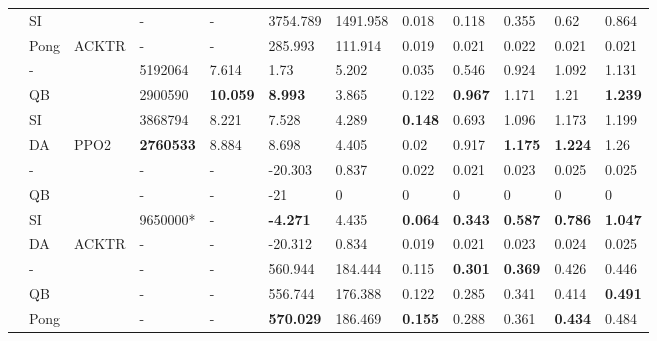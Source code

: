 \begin{table}[]
\begin{tabular}{p{1.3cm}p{1cm}p{0.9cm}p{1cm}p{1.3cm}p{1.2cm}p{1.2cm}p{0.7cm}p{0.7cm}p{0.7cm}p{0.7cm}p{0.7cm}}
		\rowcolor[HTML]{C0C0C0} 
		\cellcolor[HTML]{EFEFEF} & SI & \cellcolor[HTML]{C0C0C0} & - & - & 3754.789 & 1491.958 & 0.018 & 0.118 & 0.355 & 0.62 & 0.864 \\
		\rowcolor[HTML]{C0C0C0} 
		\multirow{-8}{*}{\cellcolor[HTML]{EFEFEF}Q*Bert} & Pong & \multirow{-4}{*}{\cellcolor[HTML]{C0C0C0}ACKTR} & - & - & 285.993 & 111.914 & 0.019 & 0.021 & 0.022 & 0.021 & 0.021 \\
		\rowcolor[HTML]{EFEFEF} 
		\cellcolor[HTML]{C0C0C0} & - & \cellcolor[HTML]{EFEFEF} & 5192064 & 7.614 & 1.73 & 5.202 & 0.035 & 0.546 & 0.924 & 1.092 & 1.131 \\
		\rowcolor[HTML]{EFEFEF} 
		\cellcolor[HTML]{C0C0C0} & QB & \cellcolor[HTML]{EFEFEF} & 2900590 & \textbf{10.059} & \textbf{8.993} & 3.865 & 0.122 & \textbf{0.967} & 1.171 & 1.21 & \textbf{1.239} \\
		\rowcolor[HTML]{EFEFEF} 
		\cellcolor[HTML]{C0C0C0} & SI & \cellcolor[HTML]{EFEFEF} & 3868794 & 8.221 & 7.528 & 4.289 & \textbf{0.148} & 0.693 & 1.096 & 1.173 & 1.199 \\
		\rowcolor[HTML]{EFEFEF} 
		\cellcolor[HTML]{C0C0C0} & DA & \multirow{-4}{*}{\cellcolor[HTML]{EFEFEF}PPO2} & \textbf{2760533} & 8.884 & 8.698 & 4.405 & 0.02 & 0.917 & \textbf{1.175} & \textbf{1.224} & 1.26 \\
		\rowcolor[HTML]{C0C0C0} 
		\cellcolor[HTML]{C0C0C0} & - & \cellcolor[HTML]{C0C0C0} & - & - & -20.303 & 0.837 & 0.022 & 0.021 & 0.023 & 0.025 & 0.025 \\
		\rowcolor[HTML]{C0C0C0} 
		\cellcolor[HTML]{C0C0C0} & QB & \cellcolor[HTML]{C0C0C0} & - & - & -21 & 0 & 0 & 0 & 0 & 0 & 0 \\
		\rowcolor[HTML]{C0C0C0} 
		\cellcolor[HTML]{C0C0C0} & SI & \cellcolor[HTML]{C0C0C0} & 9650000* & - & \textbf{-4.271} & 4.435 & \textbf{0.064} & \textbf{0.343} & \textbf{0.587} & \textbf{0.786} & \textbf{1.047} \\
		\rowcolor[HTML]{C0C0C0} 
		\multirow{-8}{*}{\cellcolor[HTML]{C0C0C0}Pong} & DA & \multirow{-4}{*}{\cellcolor[HTML]{C0C0C0}ACKTR} & - & - & -20.312 & 0.834 & 0.019 & 0.021 & 0.023 & 0.024 & 0.025 \\
		\rowcolor[HTML]{EFEFEF} 
		& - & \cellcolor[HTML]{EFEFEF} & - & - & 560.944 & 184.444 & 0.115 & \textbf{0.301} & \textbf{0.369} & 0.426 & 0.446 \\
		\rowcolor[HTML]{EFEFEF} 
		& QB & \cellcolor[HTML]{EFEFEF} & - & - & 556.744 & 176.388 & 0.122 & 0.285 & 0.341 & 0.414 & \textbf{0.491} \\
		\rowcolor[HTML]{EFEFEF} 
		& Pong & \cellcolor[HTML]{EFEFEF} & - & - & \textbf{570.029} & 186.469 & \textbf{0.155} & 0.288 & 0.361 & \textbf{0.434} & 0.484 \\

\end{tabular}
\end{table}
